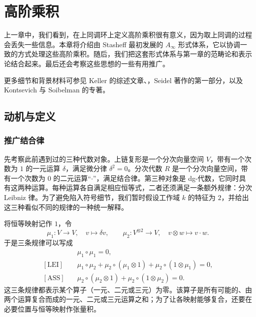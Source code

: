 \chapter{高阶乘积}\label{ch:higher-products}
上一章中，我们看到，在上同调环上定义高阶乘积很有意义，因为取上同调的过程会丢失一些信息。本章将介绍由 Stasheff 最初发展的 $A_\infty$ 形式体系，它以协调一致的方式处理这些高阶乘积。随后，我们把这套形式体系与第一章的范畴论和表示论结合起来。最后还会考察这些思想的一些有用推广。

更多细节和背景材料可参见 Keller 的综述文章、，Seidel 著作的第一部分，以及 Kontsevich 与 Soibelman 的专著。

\section{动机与定义}\label{sec:ainfty-motivation}
\subsection{推广结合律}\label{subsec:generalizing-associativity}
先考察此前遇到过的三种代数对象。上链复形是一个分次向量空间 $V$，带有一个次数为 $1$ 的一元运算 $\delta$，满足微分律 $\delta^2=0$。分次代数 $R$ 是一个分次向量空间，带有一个次数为 $0$ 的二元运算“$\cdot$”，满足结合律。第三种对象是 dg-代数，它同时具有这两种运算。每种运算各自满足相应恒等式，二者还须满足一条额外规律：分次 Leibniz 律。为了避免陷入符号细节，我们暂时假设工作域 $k$ 的特征为 $2$，并给出这三种看似不同的规律的一种统一解释。

将恒等映射记作 $1$，令
\[
  \mu_1\colon V\to V,\quad v\longmapsto\delta v,
\qquad
  \mu_2\colon V^{\otimes2}\to V,\quad
  v\otimes w\longmapsto v\cdot w.
\]
于是三条规律可以写成
\begin{align*}
  [\mathrm{DIF}]&\quad \mu_1\circ\mu_1=0,\\
  [\mathrm{LEI}]&\quad
  \mu_1\circ\mu_2+\mu_2\circ(\mu_1\otimes1)
  +\mu_2\circ(1\otimes\mu_1)=0,\\
  [\mathrm{ASS}]&\quad
  \mu_2\circ(\mu_2\otimes1)+\mu_2\circ(1\otimes\mu_2)=0.
\end{align*}
这三条规律都表示某个算子（一元、二元或三元）为零。该算子是所有可能的、由两个运算复合而成的一元、二元或三元运算之和；为了让各映射能够复合，还要在必要位置与恒等映射作张量积。

